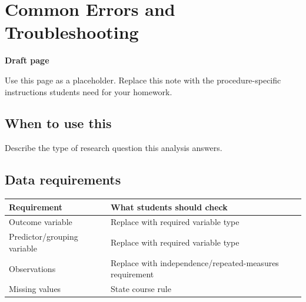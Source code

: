 \documentclass[
  letterpaper,
  DIV=11,
  numbers=noendperiod]{scrreprt}
\newcounter{none} %
\begin{document}
\chapter{Common Errors and
Troubleshooting}\label{common-errors-and-troubleshooting}

\begin{tcolorbox}[enhanced jigsaw, arc=.35mm, bottomrule=.15mm, breakable, colback=white, colframe=quarto-callout-note-color-frame, left=2mm, leftrule=.75mm, opacityback=0, rightrule=.15mm, toprule=.15mm]
\begin{minipage}[t]{5.5mm}
\textcolor{quarto-callout-note-color}{\faInfo}
\end{minipage}%
\begin{minipage}[t]{\textwidth - 5.5mm}

\vspace{-3mm}\textbf{Draft page}\vspace{3mm}

Use this page as a placeholder. Replace this note with the
procedure-specific instructions students need for your homework.

\end{minipage}%
\end{tcolorbox}

\section{When to use this}\label{when-to-use-this-12}

Describe the type of research question this analysis answers.

\section{Data requirements}\label{data-requirements-13}

{\def\LTcaptype{none} %
\begin{longtable}[]{@{}
  >{\raggedright\arraybackslash}p{}
  >{\raggedright\arraybackslash}p{}@{}}
\toprule\noalign{}
\begin{minipage}[b]{\linewidth}\raggedright
Requirement
\end{minipage} & \begin{minipage}[b]{\linewidth}\raggedright
What students should check
\end{minipage} \\
\midrule\noalign{}
\endhead
\bottomrule\noalign{}
\endlastfoot
Outcome variable & Replace with required variable type \\
Predictor/grouping variable & Replace with required variable type \\
Observations & Replace with independence/repeated-measures
requirement \\
Missing values & State course rule \\
\end{longtable}
}
\end{document}
